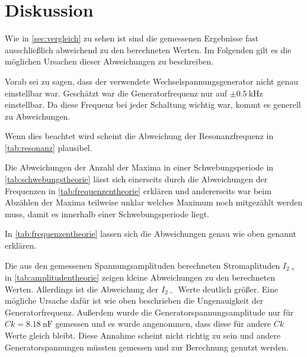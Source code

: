 \section{Diskussion}
\label{sec:Diskussion}


Wie in \autoref{sec:vergleich} zu sehen ist sind die gemessenen Ergebnisse fast ausschließlich abweichend zu den berechneten Werten. Im Folgenden gilt es die möglichen Ursachen dieser Abweichungen zu beschreiben.

Vorab sei zu sagen, dass der verwendete Wechselspannungsgenerator nicht genau einstellbar war. Geschätzt war die Generatorfrequenz nur auf $\pm \SI{0.5}{\kilo\hertz}$ einstellbar. 
Da diese Frequenz bei jeder Schaltung wichtig war, kommt es generell zu Abweichungen.

Wenn dies beachtet wird scheint die Abweichung der Resonanzfrequenz in \autoref{tab:resonanz} plausibel.

Die Abweichungen der Anzahl der Maxima in einer Schwebungsperiode in \autoref{tab:schwebungstheorie} lässt sich einerseits durch die Abweichungen der Frequenzen in \autoref{tab:frequenzentheorie} erklären und andererseits war beim Abzählen der Maxima teilweise unklar welches Maximum noch mitgezählt werden muss, damit es innerhalb einer Schwebungsperiode liegt.

In \autoref{tab:frequenzentheorie} lassen sich die Abweichungen genau wie oben genannt erklären.

Die aus den gemessenen Spannungsamplituden berechneten Stromaplituden $I_{2+}$ in \autoref{tab:amplitudentheorie} zeigen kleine Abweichungen zu den berechneten Werten.
Allerdings ist die Abweichung der $I_{2-}$ Werte deutlich größer. 
Eine mögliche Ursache dafür ist wie oben beschrieben die Ungenauigkeit der Generatorfrequenz. Außerdem wurde die Generatorspannungsamplitude nur für $Ck = \SI{8.18}{\nano\farad}$ gemessen und es wurde angenommen, dass diese für andere $Ck$ Werte gleich bleibt. Diese Annahme scheint nicht richtig zu sein und andere Generatorspannungen müssten gemessen und zur Berechnung genutzt werden.